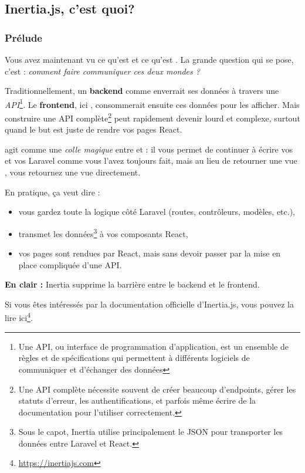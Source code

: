 \subsection{Inertia.js, c'est quoi?}

\subsubsection[Prélude]{Prélude}

Vous avez maintenant vu ce qu’est \laravel{} et ce qu’est \react{}.  
La grande question qui se pose, c’est : \textit{comment faire communiquer ces deux mondes ?}  

Traditionnellement, un \textbf{backend} comme \laravel{} enverrait ses données à travers une \textit{API}\footnote{Une API, ou interface de programmation d'application, est un ensemble de règles et de spécifications qui permettent à différents logiciels de communiquer et d'échanger des données}.  
Le \textbf{frontend}, ici \react{}, consommerait ensuite ces données pour les afficher.  
Mais construire une API complète\footnote{Une API complète nécessite souvent de créer beaucoup d’endpoints, gérer les statuts d’erreur, les authentifications, et parfois même écrire de la documentation pour l’utiliser correctement.} peut rapidement devenir lourd et complexe, surtout quand le but est juste de rendre vos pages React.
  
\inertia{} agit comme une \textit{colle magique} entre \laravel{} et \react{} :  
il vous permet de continuer à écrire vos \controllers{} et vos \routes{} Laravel comme vous l’avez toujours fait,  
mais au lieu de retourner une vue \blade{}, vous retournez une vue \react{} directement.  

En pratique, ça veut dire :
\begin{itemize}
    \item vous gardez toute la logique côté Laravel (routes, contrôleurs, modèles, etc.),  
    \item \inertia{} transmet les données\footnote{Sous le capot, Inertia utilise principalement le JSON pour transporter les données entre Laravel et React.} à vos composants React,  
    \item vos pages sont rendues par React, mais sans devoir passer par la mise en place compliquée d’une API.
\end{itemize}

\textbf{En clair :} Inertia supprime la barrière entre le backend et le frontend.

Si vous êtes intéressés par la documentation officielle d’Inertia.js, vous pouvez la lire ici\footnote{\href{https://inertiajs.com}{https://inertiajs.com}}.
